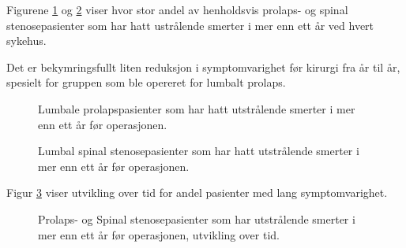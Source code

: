       
      

Figurene \ref{fig:VarighSmerteUtstrAvdPro} og \ref{fig:VarighSmerteUtstrAvdSS} viser hvor stor andel av henholdsvis prolaps- og spinal stenosepasienter som har hatt ustrålende smerter i mer enn ett år ved hvert sykehus.

Det er bekymringsfullt liten reduksjon i symptomvarighet før kirurgi fra år til år, spesielt for gruppen som ble opereret for lumbalt prolaps.



 


\begin{figure}[h] 
\caption{Lumbale prolapspasienter som har hatt utstrålende smerter i mer enn ett år før operasjonen.}
\label{fig:VarighSmerteUtstrAvdPro}
\end{figure}

\begin{figure}[h] 
\caption{Lumbal spinal stenosepasienter som har hatt utstrålende smerter i mer enn ett år før operasjonen.}
\label{fig:VarighSmerteUtstrAvdSS}
\end{figure}

Figur \ref{fig:VarighSmerteUtstrTid} viser utvikling over tid for andel pasienter med lang symptomvarighet. 

\begin{figure}[h] 
\caption{Prolaps- og Spinal stenosepasienter som har utstrålende smerter i mer enn ett år før operasjonen, utvikling over tid.}
\label{fig:VarighSmerteUtstrTid}
\end{figure}




									

